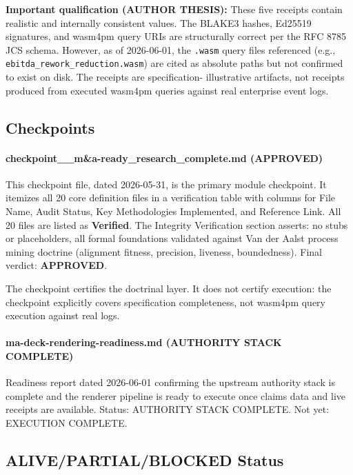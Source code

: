 \textbf{Important qualification (AUTHOR THESIS):} These five receipts contain realistic and
internally consistent values. The BLAKE3 hashes, Ed25519 signatures, and wasm4pm query URIs
are structurally correct per the RFC 8785 JCS schema. However, as of 2026-06-01, the
\texttt{.wasm} query files referenced (e.g., \texttt{ebitda\_rework\_reduction.wasm}) are
cited as absolute paths but not confirmed to exist on disk. The receipts are specification-
illustrative artifacts, not receipts produced from executed wasm4pm queries against real
enterprise event logs.

\subsection{Checkpoints}
\label{sec:ma-evidence-checkpoints}

\paragraph{checkpoint\_\_m\&a-ready\_research\_complete.md (APPROVED)}
This checkpoint file, dated 2026-05-31, is the primary module checkpoint. It itemizes all 20
core definition files in a verification table with columns for File Name, Audit Status, Key
Methodologies Implemented, and Reference Link. All 20 files are listed as \textbf{Verified}.
The Integrity Verification section asserts: no stubs or placeholders, all formal foundations
validated against Van der Aalst process mining doctrine (alignment fitness, precision,
liveness, boundedness). Final verdict: \textbf{APPROVED}.

The checkpoint certifies the doctrinal layer. It does not certify execution: the checkpoint
explicitly covers specification completeness, not wasm4pm query execution against real logs.

\paragraph{ma-deck-rendering-readiness.md (AUTHORITY STACK COMPLETE)}
Readiness report dated 2026-06-01 confirming the upstream authority stack is complete and the
renderer pipeline is ready to execute once claims data and live receipts are available. Status:
AUTHORITY STACK COMPLETE. Not yet: EXECUTION COMPLETE.

\subsection{ALIVE/PARTIAL/BLOCKED Status}
\label{sec:ma-evidence-status}

